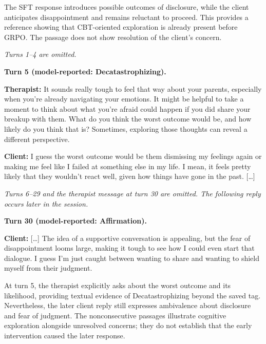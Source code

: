 The SFT response introduces possible outcomes of disclosure, while the client anticipates disappointment and remains reluctant to proceed. This provides a reference showing that CBT-oriented exploration is already present before GRPO. The passage does not show resolution of the client's concern.

\begin{tcolorbox}[breakable,colback=gray!5,colframe=gray!45,
    boxrule=0.5pt,arc=2mm,left=3mm,right=3mm,top=2mm,bottom=2mm,
    title={SFT+GRPO(D1): Decatastrophizing and unresolved concerns} ,colbacktitle=gray!15,coltitle=black]
\small\linespread{1.15}\selectfont
\textit{Turns 1--4 are omitted.}\par\medskip
\textbf{Turn 5 (model-reported: Decatastrophizing).}\par
\textbf{Therapist:} It sounds really tough to feel that way about your parents, especially when you're already navigating your emotions. It might be helpful to take a moment to think about what you're afraid could happen if you did share your breakup with them. What do you think the worst outcome would be, and how likely do you think that is? Sometimes, exploring those thoughts can reveal a different perspective.\par
\textbf{Client:} I guess the worst outcome would be them dismissing my feelings again or making me feel like I failed at something else in my life. I mean, it feels pretty likely that they wouldn't react well, given how things have gone in the past. [\ldots]\par\medskip\textit{Turns 6--29 and the therapist message at turn 30 are omitted. The following reply occurs later in the session.}\par\medskip
\textbf{Turn 30 (model-reported: Affirmation).}\par
\textbf{Client:} [\ldots] The idea of a supportive conversation is appealing, but the fear of disappointment looms large, making it tough to see how I could even start that dialogue. I guess I’m just caught between wanting to share and wanting to shield myself from their judgment.\par\medskip
\end{tcolorbox}

At turn 5, the therapist explicitly asks about the worst outcome and its likelihood, providing textual evidence of Decatastrophizing beyond the saved tag. Nevertheless, the later client reply still expresses ambivalence about disclosure and fear of judgment. The nonconsecutive passages illustrate cognitive exploration alongside unresolved concerns; they do not establish that the early intervention caused the later response.

